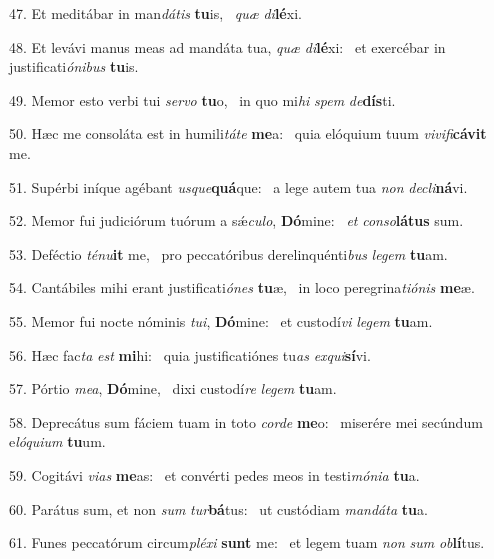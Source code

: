 47. Et meditábar in man\textit{dá}\textit{tis} \textbf{tu}is, \ast\  \textit{quæ} \textit{di}\textbf{lé}xi.\

48. Et levávi manus meas ad mandáta tua, \textit{quæ} \textit{di}\textbf{lé}xi: \ast\  et exercébar in justificati\textit{ó}\textit{ni}\textit{bus} \textbf{tu}is.\

49. Memor esto verbi tui \textit{ser}\textit{vo} \textbf{tu}o, \ast\  in quo mi\textit{hi} \textit{spem} \textit{de}\textbf{dís}ti.\

50. Hæc me consoláta est in humili\textit{tá}\textit{te} \textbf{me}a: \ast\  quia elóquium tuum \textit{vi}\textit{vi}\textit{fi}\textbf{cá}\textbf{vit} me.\

51. Supérbi iníque agébant \textit{us}\textit{que}\textbf{quá}que: \ast\  a lege autem tua \textit{non} \textit{de}\textit{cli}\textbf{ná}vi.\

52. Memor fui judiciórum tuórum a sǽ\textit{cu}\textit{lo}, \textbf{Dó}mine: \ast\  \textit{et} \textit{con}\textit{so}\textbf{lá}\textbf{tus} sum.\

53. Deféctio \textit{té}\textit{nu}\textbf{it} me, \ast\  pro peccatóribus derelinquénti\textit{bus} \textit{le}\textit{gem} \textbf{tu}am.\

54. Cantábiles mihi erant justificati\textit{ó}\textit{nes} \textbf{tu}æ, \ast\  in loco peregrina\textit{ti}\textit{ó}\textit{nis} \textbf{me}æ.\

55. Memor fui nocte nóminis \textit{tu}\textit{i}, \textbf{Dó}mine: \ast\  et custodí\textit{vi} \textit{le}\textit{gem} \textbf{tu}am.\

56. Hæc fac\textit{ta} \textit{est} \textbf{mi}hi: \ast\  quia justificatiónes tu\textit{as} \textit{ex}\textit{qui}\textbf{sí}vi.\

57. Pórtio \textit{me}\textit{a}, \textbf{Dó}mine, \ast\  dixi custodí\textit{re} \textit{le}\textit{gem} \textbf{tu}am.\

58. Deprecátus sum fáciem tuam in toto \textit{cor}\textit{de} \textbf{me}o: \ast\  miserére mei secúndum e\textit{ló}\textit{qui}\textit{um} \textbf{tu}um.\

59. Cogitávi \textit{vi}\textit{as} \textbf{me}as: \ast\  et convérti pedes meos in testi\textit{mó}\textit{ni}\textit{a} \textbf{tu}a.\

60. Parátus sum, et non \textit{sum} \textit{tur}\textbf{bá}tus: \ast\  ut custódiam \textit{man}\textit{dá}\textit{ta} \textbf{tu}a.\

61. Funes peccatórum circum\textit{plé}\textit{xi} \textbf{sunt} me: \ast\  et legem tuam \textit{non} \textit{sum} \textit{ob}\textbf{lí}tus.\

